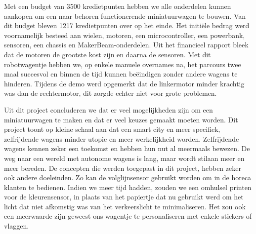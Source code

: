 \documentclass[a4paper,kulak]{kulakarticle}
\begin{document}
Met een budget van 3500 kredietpunten hebben we alle onderdelen kunnen aankopen om een naar behoren functionerende miniatuurwagen te bouwen. Van dit budget bleven 1217 kredietpunten over op het einde. Het initiële bedrag werd voornamelijk besteed aan wielen, motoren, een microcontroller, een powerbank, sensoren, een chassis en MakerBeam-onderdelen. Uit het financieel rapport bleek dat de motoren de grootste kost zijn en daarna de sensoren. 
Met dit robotwagentje hebben we, op enkele manuele overnames na, het parcours twee maal succesvol en binnen de tijd kunnen beëindigen zonder andere wagens te hinderen. Tijdens de demo werd opgemerkt dat de linkermotor minder krachtig was dan de rechtermotor, dit zorgde echter niet voor grote problemen. 

Uit dit project concluderen we dat er veel mogelijkheden zijn om een miniatuurwagen te maken en dat er veel keuzes gemaakt moeten worden. Dit project toont op kleine schaal aan dat een smart city en meer specifiek, zelfrijdende wagens minder utopie en meer werkelijkheid worden. Zelfrijdende wagens kennen zeker een toekomst en hebben hun nut al meermaals bewezen. De weg naar een wereld met autonome wagens is lang, maar wordt stilaan meer en meer bereden. De concepten die werden toegepast in dit project, hebben zeker ook andere doeleinden. Zo kan de volglijnsensor gebruikt worden om in de horeca klanten te bedienen. 
Indien we meer tijd hadden, zouden we een omhulsel printen voor de kleurensensor, in plaats van het papiertje dat nu gebruikt werd om het licht dat niet afkomstig was van het verkeerslicht te minimaliseren. Het zou ook een meerwaarde zijn geweest ons wagentje te personaliseren met enkele stickers of vlaggen. 



\end{document}
